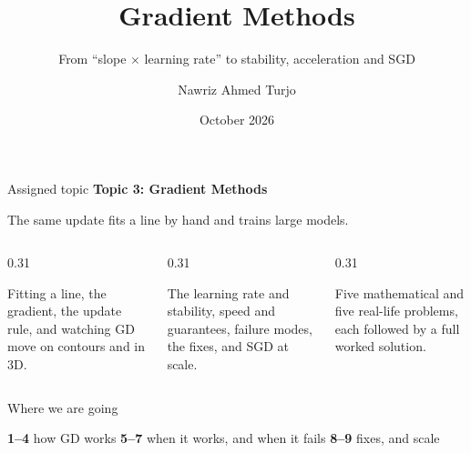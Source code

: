 \documentclass[aspectratio=169, 11pt]{beamer}
\title{Gradient Methods}
\subtitle{From ``slope $\times$ learning rate'' to stability, acceleration and SGD}
\author{Nawriz Ahmed Turjo}
\institute{CSE 402: Numerical Analysis}
\date{October 2026}
\begin{document}
\maketitle

\begin{frame}{Assigned topic}
  \centering
  \vspace{2pt}
  {\Large\textbf{Topic 3: Gradient Methods}}

  \vspace{3pt}
  {\small The same update fits a line by hand and trains large models.}

  \vspace{8pt}
  \begin{columns}[T]
    \begin{column}{0.31\textwidth}
      \begin{keybox}
        \footnotesize Fitting a line, the gradient, the update rule, and watching GD move on contours
        and in 3D.
      \end{keybox}
    \end{column}
    \begin{column}{0.31\textwidth}
      \begin{thmbox}
        \footnotesize The learning rate and stability, speed and guarantees, failure modes, the fixes,
        and SGD at scale.
      \end{thmbox}
    \end{column}
    \begin{column}{0.31\textwidth}
      \begin{probbox}
        \footnotesize Five mathematical and five real-life problems, each followed by a full
        worked solution.
      \end{probbox}
    \end{column}
  \end{columns}
\end{frame}

\begin{frame}{Where we are going}
  \centering
  

  \vspace{6pt}
  \footnotesize
  \textcolor{mNavy}{\textbf{1--4}} how GD works \qquad
  \textcolor{mOrange}{\textbf{5--7}} when it works, and when it fails \qquad
  \textcolor{mTeal}{\textbf{8--9}} fixes, and scale
\end{frame}

\end{document}
